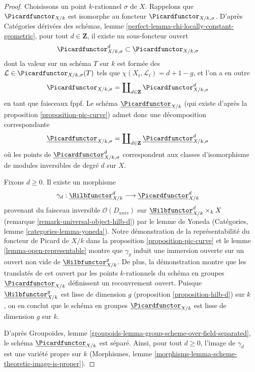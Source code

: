 \begin{proof}
Choisissons un point $k$-rationnel $\sigma$ de $X$. Rappelons que $\Picardfunctor_{X/k}$
est isomorphe au foncteur $\Picardfunctor_{X/k, \sigma}$. D'après
Catégories dérivées des schémas, lemme
\ref{perfect-lemma-chi-locally-constant-geometric},
pour tout $d \in \mathbf{Z}$, il existe un sous-foncteur ouvert
$$
\Picardfunctor^d_{X/k, \sigma} \subset \Picardfunctor_{X/k, \sigma}
$$
dont la valeur sur un schéma $T$ sur $k$ est formée des
$\mathcal{L} \in \Picardfunctor_{X/k, \sigma}(T)$ tels que
$\chi(X_t, \mathcal{L}_t) = d + 1 - g$, et l'on a en outre
$$
\Picardfunctor_{X/k, \sigma} =
\coprod\nolimits_{d \in \mathbf{Z}} \Picardfunctor^d_{X/k, \sigma}
$$
en tant que faisceaux fppf. Le schéma $\underline{\Picardfunctor}_{X/k}$
(qui existe d'après la proposition \ref{proposition-pic-curve})
admet donc une décomposition correspondante
$$
\underline{\Picardfunctor}_{X/k, \sigma} =
\coprod\nolimits_{d \in \mathbf{Z}} \underline{\Picardfunctor}^d_{X/k, \sigma}
$$
où les points de $\underline{\Picardfunctor}^d_{X/k, \sigma}$ correspondent
aux classes d'isomorphisme de modules inversibles de degré $d$ sur $X$.

\medskip\noindent
Fixons $d \geq 0$. Il existe un morphisme
$$
\gamma_d :
\underline{\Hilbfunctor}^d_{X/k}
\longrightarrow
\underline{\Picardfunctor}^d_{X/k}
$$
provenant du faisceau inversible $\mathcal{O}(D_{univ})$ sur
$\underline{\Hilbfunctor}^d_{X/k} \times_k X$
(remarque \ref{remark-universal-object-hilb-d}) par le lemme de Yoneda
(Catégories, lemme \ref{categories-lemma-yoneda}).
Notre démonstration de la représentabilité du foncteur de Picard de $X/k$
dans la proposition \ref{proposition-pic-curve} et le
lemme \ref{lemma-open-representable} montre que $\gamma_g$
induit une immersion ouverte sur un ouvert non vide de
$\underline{\Hilbfunctor}^g_{X/k}$. De plus, la démonstration montre
que les translatés de cet ouvert par les points $k$-rationnels du
schéma en groupes $\underline{\Picardfunctor}_{X/k}$ définissent
un recouvrement ouvert. Puisque
$\underline{\Hilbfunctor}^g_{X/k}$ est lisse de dimension $g$
(proposition \ref{proposition-hilb-d})
sur $k$, on en conclut que le
schéma en groupes $\underline{\Picardfunctor}_{X/k}$ est lisse de dimension $g$
sur $k$.

\medskip\noindent
D'après Groupoïdes, lemme \ref{groupoids-lemma-group-scheme-over-field-separated},
le schéma $\underline{\Picardfunctor}_{X/k}$ est séparé.
Ainsi, pour tout $d \geq 0$, l'image de $\gamma_d$
est une variété propre sur $k$
(Morphismes, lemme \ref{morphisms-lemma-scheme-theoretic-image-is-proper}).


\end{proof}
